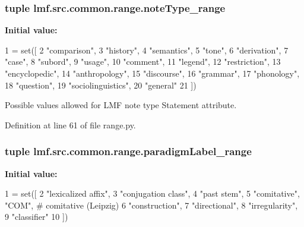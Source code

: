 \hypertarget{namespacelmf_1_1src_1_1common_1_1range_a042b6a6bbc9e29deed31854fb1767b88}{
\subsubsection[{note\+Type\+\_\+range}]{\setlength{\rightskip}{0pt plus 5cm}tuple lmf.\+src.\+common.\+range.\+note\+Type\+\_\+range}}\label{namespacelmf_1_1src_1_1common_1_1range_a042b6a6bbc9e29deed31854fb1767b88}
{\bfseries Initial value\+:}
\begin{DoxyCode}
1 = set([
2     \textcolor{stringliteral}{"comparison"},
3     \textcolor{stringliteral}{"history"},
4     \textcolor{stringliteral}{"semantics"},
5     \textcolor{stringliteral}{"tone"},
6     \textcolor{stringliteral}{"derivation"},
7     \textcolor{stringliteral}{"case"},
8     \textcolor{stringliteral}{"subord"},
9     \textcolor{stringliteral}{"usage"},
10     \textcolor{stringliteral}{"comment"},
11     \textcolor{stringliteral}{"legend"},
12     \textcolor{stringliteral}{"restriction"},
13     \textcolor{stringliteral}{"encyclopedic"},
14     \textcolor{stringliteral}{"anthropology"},
15     \textcolor{stringliteral}{"discourse"},
16     \textcolor{stringliteral}{"grammar"},
17     \textcolor{stringliteral}{"phonology"},
18     \textcolor{stringliteral}{"question"},
19     \textcolor{stringliteral}{"sociolinguistics"},
20     \textcolor{stringliteral}{"general"}
21 ])
\end{DoxyCode}


Possible values allowed for L\+M\+F note type Statement attribute. 



Definition at line 61 of file range.\+py.

\hypertarget{namespacelmf_1_1src_1_1common_1_1range_a9915518fc99ee54c5ac61a23dc12aefe}{
\subsubsection[{paradigm\+Label\+\_\+range}]{\setlength{\rightskip}{0pt plus 5cm}tuple lmf.\+src.\+common.\+range.\+paradigm\+Label\+\_\+range}}\label{namespacelmf_1_1src_1_1common_1_1range_a9915518fc99ee54c5ac61a23dc12aefe}
{\bfseries Initial value\+:}
\begin{DoxyCode}
1 = set([
2     \textcolor{stringliteral}{"lexicalized affix"},
3     \textcolor{stringliteral}{"conjugation class"},
4     \textcolor{stringliteral}{"past stem"},
5     \textcolor{stringliteral}{"comitative"}, \textcolor{stringliteral}{"COM"}, \textcolor{comment}{# comitative (Leipzig)}
6     \textcolor{stringliteral}{"construction"},
7     \textcolor{stringliteral}{"directional"},
8     \textcolor{stringliteral}{"irregularity"},
9     \textcolor{stringliteral}{"classifier"}
10 ])
\end{DoxyCode}


